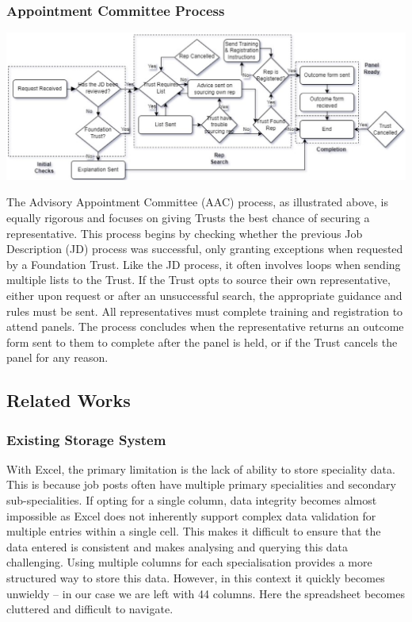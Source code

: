 \subsubsection{Appointment Committee Process}
\begin{center}
\includegraphics[width=0.85\linewidth]{images/aac.png}
\end{center}
\vspace{-2em}
\begin{multicols}{2}
The Advisory Appointment Committee (AAC) process, as illustrated above, is equally rigorous and focuses on giving Trusts the best chance of securing a representative. This process begins by checking whether the previous Job Description (JD) process was successful, only granting exceptions when requested by a Foundation Trust. Like the JD process, it often involves loops when sending multiple lists to the Trust. If the Trust opts to source their own representative, either upon request or after an unsuccessful search, the appropriate guidance and rules must be sent. All representatives must complete training and registration to attend panels. The process concludes when the representative returns an outcome form sent to them to complete after the panel is held, or if the Trust cancels the panel for any reason.
\subsection{Related Works}
\subsubsection{Existing Storage System}
With Excel, the primary limitation is the lack of ability to store speciality data. This is because job posts often have multiple primary specialities and secondary sub-specialities. If opting for a single column, data integrity becomes almost impossible as Excel does not inherently support complex data validation for multiple entries within a single cell. This makes it difficult to ensure that the data entered is consistent and makes analysing and querying this data challenging. Using multiple columns for each specialisation provides a more structured way to store this data. However, in this context it quickly becomes unwieldy – in our case we are left with 44 columns. Here the spreadsheet becomes cluttered and difficult to navigate.


\end{multicols}
